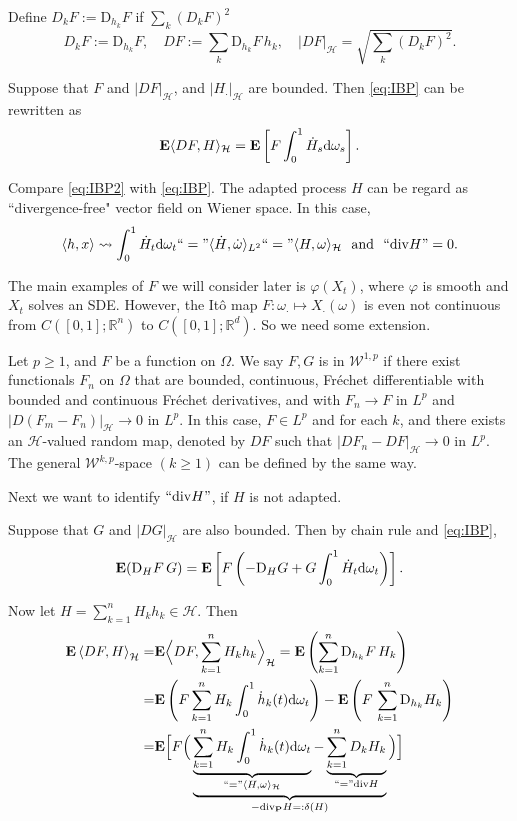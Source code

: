 \documentclass[twoside, 12pt]{book}
\numberwithin{equation}{chapter}
\def\cH{{\mathcal H}}
\def\mR{{\mathbb R}}
\def\bE{{\mathbf E}}
\def\bP{{\mathbf P}}
\def\sW{{\mathscr W}}
\def\l{\left}
\def\r{\right}
\def\<{\langle}
\def\>{\rangle}
\def\geq{\geqslant}
\def\d{\text{\rm{d}}}
\def\div{\mathord{{\rm div}}}
\begin{document}
    Define $D_kF:=\mathrm{D}_{h_k}F$ if $\sum_k ({D_k}F)^2$
    \[
    D_kF:=\mathrm{D}_{h_k}F,  \quad D F:= \sum_k \mathrm{D}_{h_k}F \, h_k, \quad |DF|_{\cH}= \sqrt{\sum_k ({D_k}F)^2}. 
    \]
    
    Suppose that $F$ and $|DF|_{\cH}$, and $|H_\cdot|_{\cH}$ are bounded. 
    Then \eqref{eq:IBP} can be rewritten as 
    \begin{equation}
    	\bE \<DF, H\>_{\cH} =  \mathbf{E}\left[F \int_0^1 \dot H_s \d \omega_s\right]. 
    \end{equation}
    
    Compare \eqref{eq:IBP2} with \eqref{eq:IBP}. 
    The adapted process $H$ can be regard as ``divergence-free" vector field on Wiener space. In this case, 
    \[
    \<h,x\> \rightsquigarrow \int_0^1 \dot H_t \d \omega_t``="\<\dot H, \dot \omega\>_{L^2}``="\< H,  \omega\>_{\cH}~ \mbox{ and }~ ``\div H"=0.
    \]  
    
    The main examples of $F$ we will consider later is $\varphi(X_t)$, where $\varphi$ is smooth and $X_t$ solves an SDE. However, the It\^o map $F: \omega_{\cdot}\mapsto X_{\cdot}(\omega)$ is even not continuous from $C([0,1];\mR^n)$ to $C([0,1];\mR^d)$. So we need some extension. 
    
    Let $p\geq 1$, and $F$ be a function on $\Omega$. We say $F, G$ is in $\sW^{1,p}$ if there exist functionals $F_n$ on $\Omega$ that are bounded, continuous, Fréchet differentiable with bounded and continuous Fréchet derivatives, and with $F_n \rightarrow F$ in $L^p$ and $|D (F_m-F_n)|_{\cH}\rightarrow 0$ in $L^p$. In this case, $F\in L^p$ and for each $k$, and there exists an $\cH$-valued random map, denoted by $DF$ such that  $|DF_n-DF|_\cH \to 0$ in $L^p$.  The general $\sW^{k,p}$-space $(k\geq 1)$ can be defined by the same way. 
    
    
    Next we want to identify $``\div H"$, if $H$ is not adapted. 
    
    Suppose that $G$ and $|DG|_{\cH}$ are also bounded. Then  by chain rule and \eqref{eq:IBP}, 
    \begin{equation*}
    	\bE (\mathrm{D}_H F\, G) = \bE\l[ F \l(-\mathrm{D}_H G+G  \int_0^1 \dot H_t \d \omega_t\r) \r]. 
    \end{equation*}
    
    Now let $H= \sum_{k=1}^n H_k h_k\in \cH$. Then 
    \[
    \begin{aligned}
    	\bE \l\<DF, H\r\>_{\cH} =&\bE \Big\<DF, \sum_{k=1}^n H_k h_k\Big\>_{\cH} = \bE \l(\sum_{k=1}^n \mathrm{D}_{h_k} F\, H_k \r)\\
    	=& \bE \l(F \sum_{k=1}^n H_k  \int_0^1 \dot h_k(t) \d \omega_t\r) - \bE \l(F\, \sum_{k=1}^n \mathrm{D}_{h_k} H_k\r)\\
    	=& \bE \Big[ F \Big( \underbrace{  \underbrace{\sum_{k=1}^n H_k  \int_0^1 \dot h_k(t) \d \omega_t}_{``="\<H,\omega\>_{\cH}}-  \underbrace{\sum_{k=1}^n D_{k} H_k}_{``="\div H}  }_{-\div_{\bP} H=:\delta(H)} \Big)\Big]
    \end{aligned}
    \]
   
\end{document}
